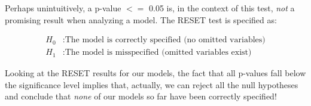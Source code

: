 Perhaps unintuitively, a p-value $<=$ 0.05 is, in the context of this test, \emph{not} a promising result when analyzing a model. The RESET test is specified as:

\begin{equation*}
\begin{aligned}
H_0&: \text{The model is correctly specified (no omitted variables)}\\
H_1&: \text{The model is misspecified (omitted variables exist)}
\end{aligned}
\end{equation*}

Looking at the RESET results for our models, the fact that all p-values fall below the significance level implies that, actually, we can reject all the null hypotheses and conclude that \emph{none} of our models so far have been correctly specified!